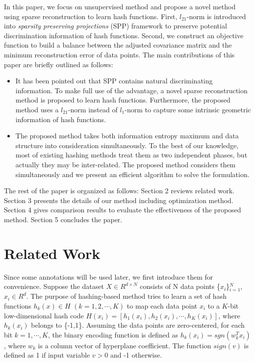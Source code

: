 \documentclass{sig-alternate}
\begin{document}
In this paper, we focus on unsupervised method and propose a novel method using sparse reconstruction to learn hash functions. First, $l_{21}$-norm is introduced into \emph{sparsity preserving projections} (SPP) framework to preserve potential discrimination information of hash functions. Second, we construct an objective function to build a balance between the adjusted covariance matrix and the minimum reconstruction error of data points. The main contributions of this paper are briefly outlined as follows:
\begin{itemize}
\setlength\baselineskip{9.4pt}
  \item It has been pointed out that SPP contains natural discriminating information. To make full use of the advantage, a novel sparse reconstruction method is proposed to learn hash functions. Furthermore, the proposed method uses a $l_{21}$-norm instead of $l_1$-norm to capture some intrinsic geometric information of hash functions.
  \item The proposed method takes both information entropy maximum and data structure into consideration simultaneously. To the best of our knowledge, most of existing hashing methods treat them  as two independent phases, but actually they may be inter-related. The proposed method considers them simultaneously and we present an efficient algorithm to solve the formulation.
\end{itemize}
The rest of the paper is organized as follows: Section 2 reviews related work. Section 3 presents the details of our method including optimization method. Section 4 gives comparison results to evaluate the effectiveness of the proposed method. Section 5 concludes the paper.

\section{Related Work}

Since some annotations will be used later, we first introduce them for convenience. Suppose the dataset $X \in R^{d \times N}$ consists of N data points \{$x_i$\}$_{i=1}^N$, $x_i \in R^d$.  The purpose of hashing-based method tries to learn a set of hash functions $h_k(x)\in H$ $(k=1, 2, \cdots, K)$ to map each data point $x_i$ to a $K$-bit low-dimensional hash code $H(x_i)=[h_1(x_i), h_2(x_i), \cdots, h_K(x_i)]$, where $h_k(x_i)$ belongs to \{-1,1\}. Assuming the data points are zero-centered, for each bit $k=1, \cdots, K$, the binary encoding function is defined as $h_k(x_i) = sgn(w_k^Tx_i)$, where $w_k$ is a column vector of hyperplane coefficient. The function $sign(v)$ is defined as 1 if input variable $v>0$ and -1 otherwise.
\end{document}
